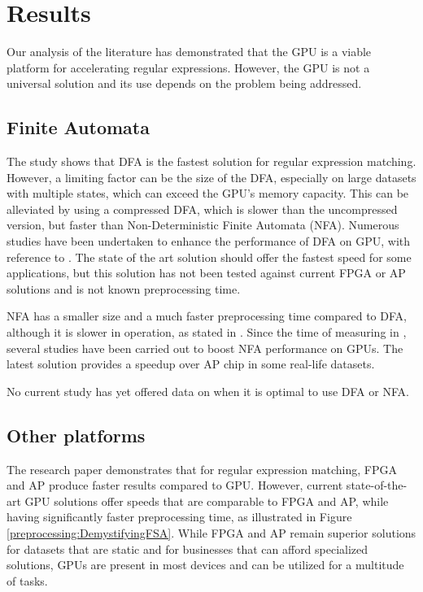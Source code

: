 \documentclass[10pt,onecolumn,twoside,english,a4paper]{article}
\begin{document}
\section{Results} \label{Results}
Our analysis of the literature has demonstrated that the GPU is a viable platform for accelerating regular expressions. However, the GPU is not a universal solution and its use depends on the problem being addressed.
\subsection{Finite Automata} \label{Finite Automata:Results}
The study \cite{Becchi:regex_large_dataset} shows that DFA is the fastest solution for regular expression matching. However, a limiting factor can be the size of the DFA, especially on large datasets with multiple states, which can exceed the GPU's memory capacity. This can be alleviated by using a compressed DFA, which is slower than the uncompressed version, but faster than Non-Deterministic Finite Automata (NFA). Numerous studies have been undertaken to enhance the performance of DFA on GPU, with reference to \cite{zhao2015fly,Xia:FSA-scaling,wang2022gspecpal}. The state of the art solution \cite{wang2022gspecpal} should offer the fastest speed for some applications, but this solution has not been tested against current FPGA or AP solutions and is not known preprocessing time.

NFA has a smaller size and a much faster preprocessing time compared to DFA, although it is slower in operation, as stated in \cite{Nourian:DemystifyingFSA}. Since the time of measuring in \cite{Becchi:regex_large_dataset}, several studies \cite{Liu:WhyGPUSlowNFA,Liu:Asynchronous} have been carried out to boost NFA performance on GPUs. The latest solution \cite{Liu:Asynchronous} provides a speedup over AP chip in some real-life datasets.

No current study has yet offered data on when it is optimal to use DFA or NFA.

\subsection{Other platforms} \label{Other platforms:Results}
The research paper \cite{Nourian:DemystifyingFSA} demonstrates that for regular expression matching, FPGA and AP produce faster results compared to GPU. However, current state-of-the-art GPU solutions offer speeds that are comparable to FPGA and AP, while having significantly faster preprocessing time, as illustrated in Figure \ref{preprocessing:DemystifyingFSA}. While FPGA and AP remain superior solutions for datasets that are static and for businesses that can afford specialized solutions, GPUs are present in most devices and can be utilized for a multitude of tasks.
\end{document}
